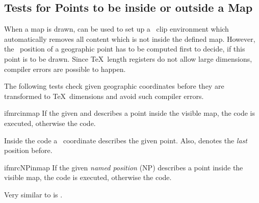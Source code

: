 \clearpage
\subsection{Tests for Points to be inside or outside a Map}

When a map is drawn,  can be used to set up a
\tikzname\ clip environment which automatically removes all content which
is not inside the defined map. However, the \tikzname\ position of a geographic
point has to be computed first to decide, if this point is to be drawn.
Since \TeX\ length registers do not allow large dimensions, compiler errors
are possible to happen.

The following tests check given geographic coordinates before they are
transformed to \TeX\ dimensions and avoid such compiler errors.

\begin{docCommand}{ifmrcinmap}{}
  If the given  and  describes a point
  inside the visible map, the  code is executed, otherwise
  the  code.\par
  Inside the  code a \tikzname\ coordinate 
  describes the given point. Also,  denotes the
  \emph{last} position before.
  \begin{dispListing}
  \end{dispListing}
\end{docCommand}

\begin{docCommand}{ifmrcNPinmap}{}
  If the given \emph{named position} (NP)  describes a point
  inside the visible map, the  code is executed, otherwise
  the  code.
  \begin{dispListing}
  \end{dispListing}
\end{docCommand}


Very similar to  is .

